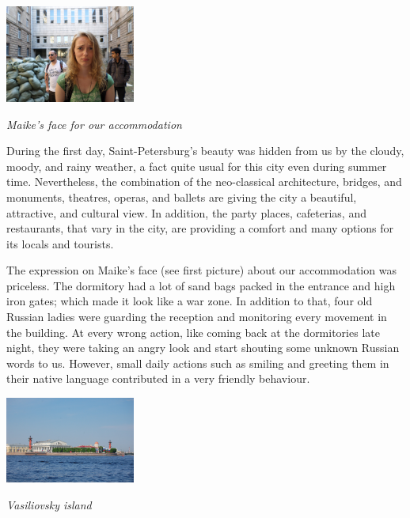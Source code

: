 \documentclass[10pt,a4paper]{article} %
\begin{document}
\begin{multicols}{3}
\begin{center}
	\includegraphics[width=0.32\textwidth]{media/accommodation_in_spb.jpg}
	\par\textit{Maike's face for our accommodation}
\end{center}


During the first day, Saint-Petersburg's beauty was hidden from us by the cloudy, 
moody, and rainy weather, a fact quite usual for this city even during summer time.  
Nevertheless, the combination of the neo-classical architecture, bridges, and 
monuments, theatres, operas, and ballets are giving the city a beautiful, attractive, 
and cultural view. 
In addition, the party places, cafeterias, and restaurants, that vary in the 
city, are providing a comfort and many options for its locals and tourists. 


The expression on Maike's face (see first picture) about our accommodation was 
priceless. 
The dormitory had a lot of sand bags packed in the entrance and high iron gates; 
which made it look like a war zone.  
In addition to that, four old Russian ladies were guarding the reception and 
monitoring every movement in the building. 
At every wrong action, like coming back at the dormitories late night, they 
were taking an angry look and start shouting some unknown Russian words to us. 
However, small daily actions such as smiling and greeting them in their native 
language contributed in a very friendly behaviour.  


\begin{center}
	\includegraphics[width=0.32\textwidth]{media/spb_1.jpg}
	\par\textit{Vasiliovsky island}
\end{center}



\end{multicols}
\end{document}
